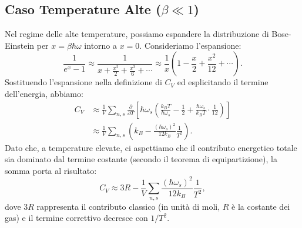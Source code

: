 \subsection*{Caso Temperature Alte (\(\beta \ll 1\))}
Nel regime delle alte temperature, possiamo espandere la distribuzione di Bose-Einstein per \(x = \beta \hbar \omega\) intorno a \(x=0\). Consideriamo l'espansione:
\begin{equation}
    \frac{1}{e^x - 1} \approx \frac{1}{x + \frac{x^2}{2} + \frac{x^3}{6} + \cdots} \approx \frac{1}{x}\left(1 - \frac{x}{2} + \frac{x^2}{12} + \cdots\right).
\end{equation}
Sostituendo l'espansione nella definizione di \(C_V\) ed esplicitando il termine dell'energia, abbiamo:
\begin{equation}
\begin{split}
    C_V &\approx \frac{1}{V}\sum_{n,s} \frac{\partial}{\partial T} \left[ \hbar \omega_s \left(\frac{k_B T}{\hbar \omega_s} - \frac{1}{2} + \frac{\hbar \omega_s}{k_B T} \cdot \frac{1}{12} \right) \right] \\
    &\approx \frac{1}{V}\sum_{n,s} \left( k_B - \frac{(\hbar \omega_s)^2}{12 k_B} \frac{1}{T^2}\right).
\end{split}
\end{equation}
Dato che, a temperature elevate, ci aspettiamo che il contributo energetico totale sia dominato dal termine costante (secondo il teorema di equipartizione), la somma porta al risultato:
\begin{equation}
    C_V \approx 3R - \frac{1}{V}\sum_{n,s} \frac{(\hbar \omega_s)^2}{12 k_B}\frac{1}{T^2},
\end{equation}
dove \(3R\) rappresenta il contributo classico (in unità di moli, \(R\) è la costante dei gas) e il termine correttivo decresce con \(1/T^2\).

